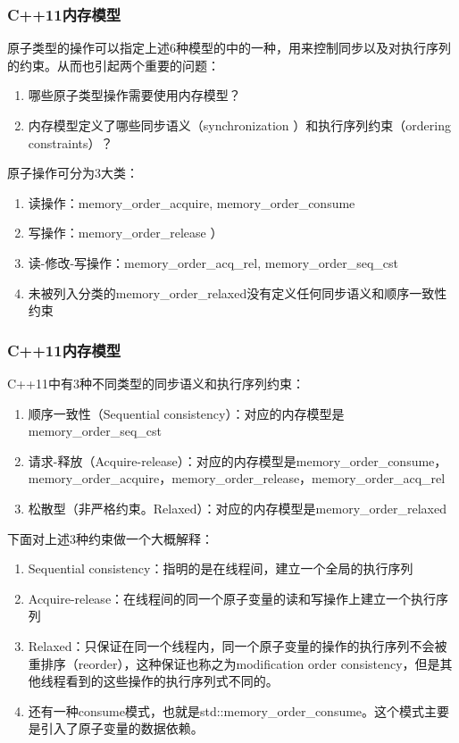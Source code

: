 \begin{frame}
\frametitle{C++11内存模型}
原子类型的操作可以指定上述6种模型的中的一种，用来控制同步以及对执行序列的约束。从而也引起两个重要的问题：
\begin{enumerate}
	\item 哪些原子类型操作需要使用内存模型？
	\item 内存模型定义了哪些同步语义（synchronization ）和执行序列约束（ordering constraints）？
\end{enumerate}

原子操作可分为3大类：
\begin{enumerate}
	\item 读操作：memory\_order\_acquire, memory\_order\_consume
	\item 写操作：memory\_order\_release ）
	\item 读-修改-写操作：memory\_order\_acq\_rel, memory\_order\_seq\_cst
	\item 未被列入分类的memory\_order\_relaxed没有定义任何同步语义和顺序一致性约束
\end{enumerate}

\end{frame}

\begin{frame}
\frametitle{C++11内存模型}
 C++11中有3种不同类型的同步语义和执行序列约束：
\begin{enumerate}
	\item 顺序一致性（Sequential consistency）：对应的内存模型是memory\_order\_seq\_cst
	\item 请求-释放（Acquire-release）：对应的内存模型是memory\_order\_consume，memory\_order\_acquire，memory\_order\_release，memory\_order\_acq\_rel
	\item 松散型（非严格约束。Relaxed）：对应的内存模型是memory\_order\_relaxed
\end{enumerate}

下面对上述3种约束做一个大概解释：
\begin{enumerate}
	\item Sequential consistency：指明的是在线程间，建立一个全局的执行序列
	\item Acquire-release：在线程间的同一个原子变量的读和写操作上建立一个执行序列
	\item Relaxed：只保证在同一个线程内，同一个原子变量的操作的执行序列不会被重排序（reorder），这种保证也称之为modification order consistency，但是其他线程看到的这些操作的执行序列式不同的。
	\item 还有一种consume模式，也就是std::memory\_order\_consume。这个模式主要是引入了原子变量的数据依赖。
\end{enumerate}

\end{frame}

